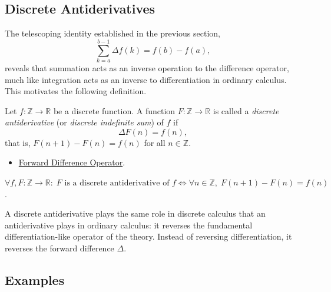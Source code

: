 
\subsection{Discrete Antiderivatives}
\label{sec:discrete-antiderivative}

The telescoping identity established in the previous section,
\[
\sum_{k=a}^{b-1} \Delta f(k) = f(b) - f(a),
\]
reveals that summation acts as an inverse operation to the difference
operator, much like integration acts as an inverse to differentiation
in ordinary calculus. This motivates the following definition.

\begin{definition}
\label{def:discrete-antiderivative}
Let \(f : \mathbb{Z} \to \mathbb{R}\) be a discrete function.
A function \(F : \mathbb{Z} \to \mathbb{R}\) is called a
\emph{discrete antiderivative} (or \emph{discrete indefinite sum}) of \(f\) if
\[
\Delta F(n) = f(n),
\]
that is, \(F(n+1) - F(n) = f(n)\) for all \(n \in \mathbb{Z}\).
\end{definition}

\begin{dependencies}
\begin{itemize}
  \item \hyperref[def:forward-difference]{Forward Difference Operator}.
\end{itemize}
\end{dependencies}

\begin{remark*}
\(\forall f,F : \mathbb{Z}\to\mathbb{R}:\;
F \text{ is a discrete antiderivative of } f
\iff
\forall n \in \mathbb{Z},\; F(n+1) - F(n) = f(n)\).
\end{remark*}

\begin{remark*}[Analogy]
A discrete antiderivative plays the same role in discrete calculus that an
antiderivative plays in ordinary calculus: it reverses the fundamental
differentiation-like operator of the theory. Instead of reversing
differentiation, it reverses the forward difference \(\Delta\).
\end{remark*}

\subsection*{Examples}

